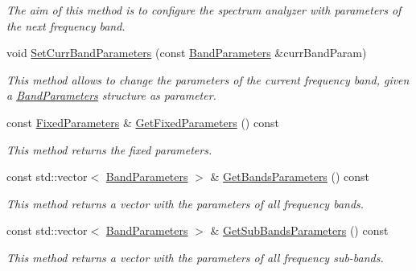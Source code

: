 \begin{DoxyCompactItemize}
\begin{DoxyCompactList}\small\item\em The aim of this method is to configure the spectrum analyzer with parameters of the next frequency band. \end{DoxyCompactList}\item 
void \hyperlink{classSpectranConfigurator_a7402a16a8514a0c1b230164b7f5d9d21}{Set\+Curr\+Band\+Parameters} (const \hyperlink{structBandParameters}{Band\+Parameters} \&curr\+Band\+Param)
\begin{DoxyCompactList}\small\item\em This method allows to change the parameters of the current frequency band, given a {\itshape \hyperlink{structBandParameters}{Band\+Parameters}} structure as parameter. \end{DoxyCompactList}\item 
\mbox{\label{classSpectranConfigurator_a4d5f0fc0842d96bdaef2555f63cd5ad6}} 
const \hyperlink{structSpectranConfigurator_1_1FixedParameters}{Fixed\+Parameters} \& \hyperlink{classSpectranConfigurator_a4d5f0fc0842d96bdaef2555f63cd5ad6}{Get\+Fixed\+Parameters} () const
\begin{DoxyCompactList}\small\item\em This method returns the fixed parameters. \end{DoxyCompactList}\item 
\mbox{\label{classSpectranConfigurator_a8d7445409e7e019d9763228343d04c5f}} 
const std\+::vector$<$ \hyperlink{structBandParameters}{Band\+Parameters} $>$ \& \hyperlink{classSpectranConfigurator_a8d7445409e7e019d9763228343d04c5f}{Get\+Bands\+Parameters} () const
\begin{DoxyCompactList}\small\item\em This method returns a vector with the parameters of all frequency bands. \end{DoxyCompactList}\item 
\mbox{\label{classSpectranConfigurator_a9349287cdb255852996aa5b07e83bf0d}} 
const std\+::vector$<$ \hyperlink{structBandParameters}{Band\+Parameters} $>$ \& \hyperlink{classSpectranConfigurator_a9349287cdb255852996aa5b07e83bf0d}{Get\+Sub\+Bands\+Parameters} () const
\begin{DoxyCompactList}\small\item\em This method returns a vector with the parameters of all frequency sub-\/bands. \end{DoxyCompactList}\item 

\end{DoxyCompactItemize}
